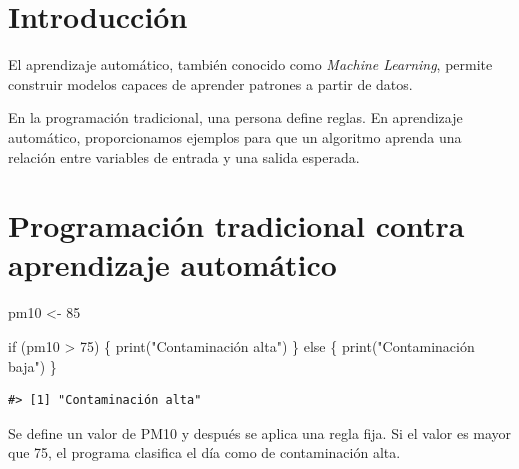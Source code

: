 \documentclass[
  spanish,
  10.5pt,
  letterpaper,
  openany,
  headings=big]{scrbook}
\newenvironment{Shaded}{}{}
\newcommand{\ControlFlowTok}[1]{\textcolor[rgb]{0.84,0.23,0.29}{#1}}
\newcommand{\DecValTok}[1]{\textcolor[rgb]{0.00,0.36,0.77}{#1}}
\newcommand{\FunctionTok}[1]{\textcolor[rgb]{0.44,0.26,0.76}{#1}}
\newcommand{\NormalTok}[1]{\textcolor[rgb]{0.14,0.16,0.18}{#1}}
\newcommand{\OtherTok}[1]{\textcolor[rgb]{0.44,0.26,0.76}{#1}}
\newcommand{\SpecialCharTok}[1]{\textcolor[rgb]{0.00,0.36,0.77}{#1}}
\newcommand{\StringTok}[1]{\textcolor[rgb]{0.01,0.18,0.38}{#1}}
\begin{document}
\section{Introducción}\label{introducciuxf3n}

El aprendizaje automático, también conocido como \emph{Machine
Learning}, permite construir modelos capaces de aprender patrones a
partir de datos.

En la programación tradicional, una persona define reglas. En
aprendizaje automático, proporcionamos ejemplos para que un algoritmo
aprenda una relación entre variables de entrada y una salida esperada.

\section{Programación tradicional contra aprendizaje
automático}\label{programaciuxf3n-tradicional-contra-aprendizaje-automuxe1tico}

\begin{Shaded}
\begin{Highlighting}[]
\NormalTok{pm10 }\OtherTok{\textless{}{-}} \DecValTok{85}

\ControlFlowTok{if}\NormalTok{ (pm10 }\SpecialCharTok{\textgreater{}} \DecValTok{75}\NormalTok{) \{}
  \FunctionTok{print}\NormalTok{(}\StringTok{"Contaminación alta"}\NormalTok{)}
\NormalTok{\} }\ControlFlowTok{else}\NormalTok{ \{}
  \FunctionTok{print}\NormalTok{(}\StringTok{"Contaminación baja"}\NormalTok{)}
\NormalTok{\}}
\end{Highlighting}
\end{Shaded}

\begin{verbatim}
#> [1] "Contaminación alta"
\end{verbatim}

\begin{tcolorbox}[enhanced jigsaw, arc=.35mm, bottomrule=.15mm, bottomtitle=1mm, breakable, colback=white, colbacktitle=quarto-callout-note-color!10!white, colframe=quarto-callout-note-color-frame, coltitle=black, left=2mm, leftrule=.75mm, opacityback=0, opacitybacktitle=0.6, rightrule=.15mm, title=\textcolor{quarto-callout-note-color}{\faInfo}\hspace{0.5em}{Explicación del código}, titlerule=0mm, toprule=.15mm, toptitle=1mm]

Se define un valor de PM10 y después se aplica una regla fija. Si el
valor es mayor que 75, el programa clasifica el día como de
contaminación alta.

\end{tcolorbox}
\end{document}
